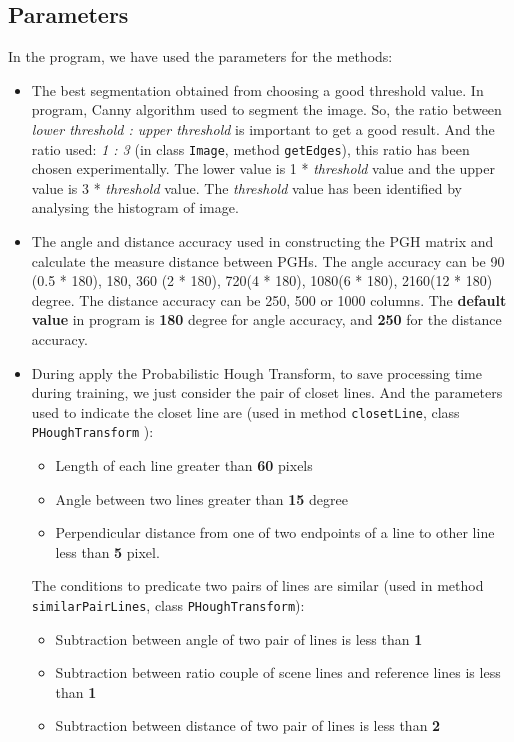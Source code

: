 \subsection{Parameters}
In the program, we have used the parameters for the methods:
\begin{itemize}
\item The best segmentation obtained from choosing a good threshold value. In program, Canny algorithm used to segment the image. So, the ratio between \textit{lower threshold : upper threshold} is important to get a good result. And the ratio used: \textit{1 : 3} (in class \texttt{Image}, method \texttt{getEdges}), this ratio has been chosen experimentally. The lower value is 1 * \textit{threshold} value and the upper value is 3 * \textit{threshold} value. The \textit{threshold} value has been identified by analysing the histogram of image. 
\item The angle and distance accuracy used in constructing the PGH matrix and calculate the measure distance between PGHs. The angle accuracy can be 90 (0.5 * 180), 180, 360 (2 * 180), 720(4 * 180), 1080(6 * 180), 2160(12 * 180) degree. The distance accuracy can be 250, 500 or 1000 columns. The \textbf{default value} in program is \textbf{180} degree for angle accuracy, and \textbf{250} for the distance accuracy. 
\item During apply the Probabilistic Hough Transform, to save processing time during training, we just consider the pair of closet lines. And the parameters used to indicate the closet line are (used in method \texttt{closetLine}, class \texttt{PHoughTransform} ):
	\begin{itemize}
		\item Length of each line greater than \textbf{60} pixels
		\item Angle between two lines greater than \textbf{15} degree
		\item Perpendicular distance from one of two endpoints of a line to other line less than \textbf{5} pixel.
	\end{itemize}
The conditions to predicate two pairs of lines are similar (used in method \texttt{similarPairLines}, class \texttt{PHoughTransform}):
	\begin{itemize}
		\item Subtraction between angle of two pair of lines is less than \textbf{1}
		\item Subtraction between ratio couple of scene lines and reference lines is less than \textbf{1}
		\item Subtraction between distance of two pair of lines is less than \textbf{2}

\end{itemize}
\end{itemize}
